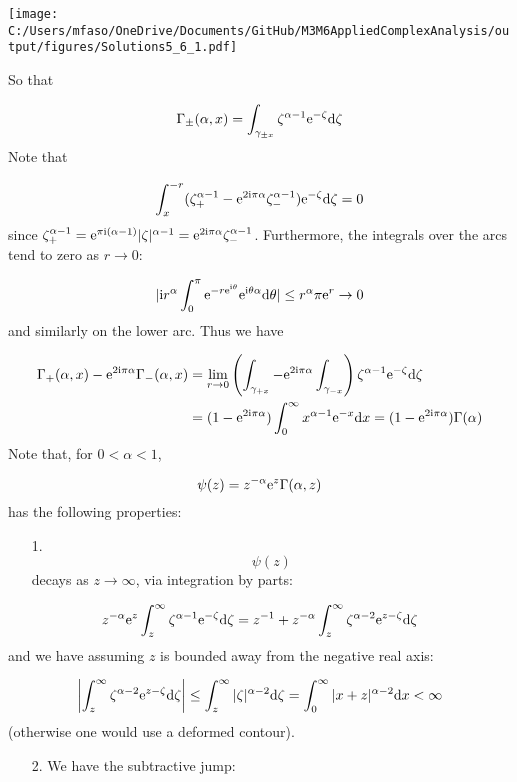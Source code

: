 \documentclass[12pt,a4paper]{article}
\def\D{ {\rm d} }
\def\I{ {\rm i} }
\def\E{ {\rm e} }
\def\addtab#1={#1\;&=}
\def\ccr{\\\addtab}
\def\dx{\D x}
\def\addtab#1={#1\;&=}
\def\ccr{\\\addtab}
\begin{document}
\texttt{[image: C:/Users/mfaso/OneDrive/Documents/GitHub/M3M6AppliedComplexAnalysis/output/figures/Solutions5\_6\_1.pdf]}

So that

\[
\Gamma_\pm(\alpha, x) = \int_{\gamma_{\pm x}} \zeta^{\alpha-1} \E^{-\zeta} \D \zeta
\]
Note that

\[
\int_x^{-r} (\zeta_+^{\alpha - 1} - \E^{2 \I \pi \alpha} \zeta_-^{\alpha -1}) \E^{-\zeta} \D\zeta = 0
\]
since $\zeta_+^{\alpha-1} = \E^{\pi \I (\alpha-1)}|\zeta|^{\alpha-1} = \E^{2 \I \pi \alpha} \zeta_-^{\alpha-1}$. Furthermore, the integrals over the arcs tend to zero as $r \rightarrow 0$:

\[
|\I r^\alpha \int_0^\pi \E^{- r \E^{\I \theta}} \E^{\I \theta \alpha} \D \theta  | \leq r^\alpha \pi \E^r  \rightarrow 0
\]
and similarly on the lower arc. Thus we have


\begin{align*}
\Gamma_+(\alpha, x)-\E^{2 \I \pi \alpha} \Gamma_-(\alpha, x) &= \lim_{r \rightarrow 0 } \left(\int_{\gamma_{+x}} - \E^{2 \I \pi \alpha} \int_{\gamma_{-x}}\right) \zeta^{\alpha-1} \E^{-\zeta} \D \zeta \ccr
 = (1 - \E^{2 \I \pi \alpha})\int_0^\infty x^{\alpha-1} \E^{-x} \dx = (1 - \E^{2 \I \pi \alpha})\Gamma(\alpha)
\end{align*}
Note that, for $0 < \alpha < 1$,

\[
    \psi(z) = z^{-\alpha} \E^z \Gamma(\alpha, z)
\]
has the following properties:

\begin{itemize}
\item[1. ] \[
\psi(z)
\]
decays as $z \rightarrow \infty$, via integration by parts:

\end{itemize}
\[
    z^{-\alpha} \E^z \int_z^\infty \zeta^{\alpha-1} \E^{-\zeta} \D \zeta =
    z^{-1}  + z^{-\alpha} \int_z^\infty \zeta^{\alpha-2} \E^{z-\zeta} \D \zeta
\]
and we have assuming $z$ is bounded away from the negative real axis:

\[
\left\vert\int_z^\infty \zeta^{\alpha-2} \E^{z-\zeta} \D \zeta\right\vert \leq \int_z^\infty |\zeta|^{\alpha-2} \D \zeta = \int_0^\infty |x+z|^{\alpha-2} \D x  < \infty
\]
(otherwise one would use a deformed contour).

\begin{itemize}
\item[2. ] We have the subtractive jump:

\end{itemize}
\end{document}
